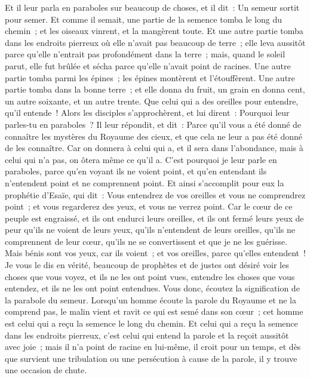 \begin{multicols}{2}
Et il leur parla en paraboles sur beaucoup de choses, et il dit~: Un semeur sortit pour semer.
Et comme il semait, une partie de la semence tomba le long du chemin~; et les oiseaux vinrent, et la mangèrent toute.
Et une autre partie tomba dans les endroits pierreux où elle n'avait pas beaucoup de terre~; elle leva aussitôt parce qu'elle n'entrait pas profondément dans la terre~;
mais, quand le soleil parut, elle fut brûlée et sécha parce qu'elle n'avait point de racines.
Une autre partie tomba parmi les épines~; les épines montèrent et l'étouffèrent.
Une autre partie tomba dans la bonne terre~; et elle donna du fruit, un grain en donna cent, un autre soixante, et un autre trente.
Que celui qui a des oreilles pour entendre, qu'il entende~!
Alors les disciples s'approchèrent, et lui dirent~: Pourquoi leur parles-tu en paraboles~?
Il leur répondit, et dit~: Parce qu'il vous a été donné de connaître les mystères du Royaume des cieux, et que cela ne leur a pas été donné de les connaître.
Car on donnera à celui qui a, et il sera dans l'abondance, mais à celui qui n'a pas, on ôtera même ce qu'il a.
C'est pourquoi je leur parle en paraboles, parce qu'en voyant ils ne voient point, et qu'en entendant ils n'entendent point et ne comprennent point.
Et ainsi s'accomplit pour eux la prophétie d'Esaïe, qui dit~: Vous entendrez de vos oreilles et vous ne comprendrez point~; et vous regarderez des yeux, et vous ne verrez point.
Car le cœur de ce peuple est engraissé, et ils ont endurci leurs oreilles, et ils ont fermé leurs yeux de peur qu'ils ne voient de leurs yeux, qu'ils n'entendent de leurs oreilles, qu'ils ne comprennent de leur cœur, qu'ils ne se convertissent et que je ne les guérisse.
Mais bénis sont vos yeux, car ils voient~; et vos oreilles, parce qu'elles entendent~!
Je vous le dis en vérité, beaucoup de prophètes et de justes ont désiré voir les choses que vous voyez, et ils ne les ont point vues, entendre les choses que vous entendez, et ils ne les ont point entendues.
Vous donc, écoutez la signification de la parabole du semeur.
Lorsqu'un homme écoute la parole du Royaume et ne la comprend pas, le malin vient et ravit ce qui est semé dans son cœur~; cet homme est celui qui a reçu la semence le long du chemin.
Et celui qui a reçu la semence dans les endroits pierreux, c'est celui qui entend la parole et la reçoit aussitôt avec joie~;
mais il n'a point de racine en lui-même, il croit pour un temps, et dès que survient une tribulation ou une persécution à cause de la parole, il y trouve une occasion de chute.

\end{multicols}
